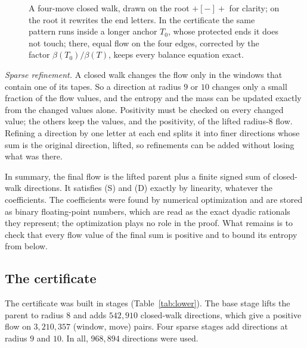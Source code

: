 \begin{figure}[htb]
\centering
{}
\caption{A four-move closed walk, drawn on the root $+[-]+$ for clarity; on the root it rewrites the end letters.
In the certificate the same pattern runs inside a longer anchor $T_0$, whose protected ends it does not touch; there,
equal flow on the four edges, corrected by the factor $\beta(T_0)/\beta(T)$, keeps every balance equation exact.}
\label{fig:cycle}
\end{figure}

\emph{Sparse refinement.} A closed walk changes the flow only in the windows that contain one of its tapes. So a
direction at radius $9$ or $10$ changes only a small fraction of the flow values, and the entropy and the mass can be
updated exactly from the changed values alone. Positivity must be checked on every changed value; the others keep the
values, and the positivity, of the lifted radius-$8$ flow. Refining a direction by one letter at each end splits it
into finer directions whose sum is the original direction, lifted, so refinements can be added without losing what was
there.

In summary, the final flow is the lifted parent plus a finite signed sum of closed-walk directions. It satisfies (S)
and (D) exactly by linearity, whatever the coefficients. The coefficients were found by numerical optimization and are
stored as binary floating-point numbers, which are read as the exact dyadic rationals they represent; the optimization
plays no role in the proof. What remains is to check that every flow value of the final sum is positive and to bound
its entropy from below.

\subsection{The certificate}

The certificate was built in stages (Table~\ref{tab:lower}). The base stage lifts the parent to radius $8$ and adds
$542{,}910$ closed-walk directions, which give a positive flow on $3{,}210{,}357$ (window, move) pairs. Four sparse
stages add directions at radius $9$ and $10$. In all, $968{,}894$ directions were used.

